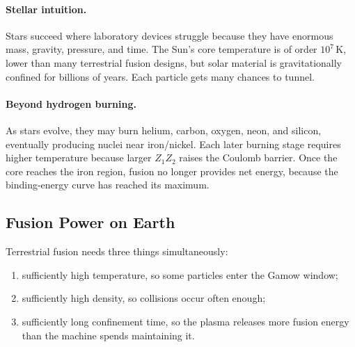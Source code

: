 \paragraph{Stellar intuition.}
Stars succeed where laboratory devices struggle because they have enormous mass,
gravity, pressure, and time. The Sun's core temperature is of order
$10^7\,\mathrm K$, lower than many terrestrial fusion designs, but solar material
is gravitationally confined for billions of years. Each particle gets many
chances to tunnel.

\paragraph{Beyond hydrogen burning.}
As stars evolve, they may burn helium, carbon, oxygen, neon, and silicon,
eventually producing nuclei near iron/nickel. Each later burning stage requires
higher temperature because larger $Z_1Z_2$ raises the Coulomb barrier. Once the
core reaches the iron region, fusion no longer provides net energy, because the
binding-energy curve has reached its maximum.

\subsection{Fusion Power on Earth}
\label{subsec:lec11:fusion_power}

Terrestrial fusion needs three things simultaneously:
\begin{enumerate}[nosep]
  \item sufficiently high temperature, so some particles enter the Gamow window;
  \item sufficiently high density, so collisions occur often enough;
  \item sufficiently long confinement time, so the plasma releases more fusion
        energy than the machine spends maintaining it.
\end{enumerate}


